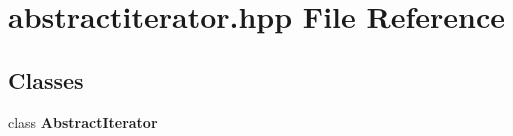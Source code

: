 \section{abstractiterator.hpp File Reference}
\label{abstractiterator_8hpp}
\subsection*{Classes}
\begin{CompactItemize}
\item 
class {\bf Abstract\-Iterator}
\end{CompactItemize}
